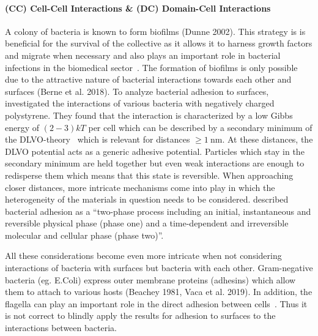 \documentclass{article}
\begin{document}
\paragraph{(CC) Cell-Cell Interactions \& (DC) Domain-Cell Interactions}
A colony of bacteria is known to form biofilms (Dunne 2002). This strategy is is beneficial for the
survival of the collective as it allows it to harness growth factors and migrate when necessary and
also plays an important role in bacterial infections in the biomedical sector~\cite{Ong1999}.
The formation of biofilms is only possible due to the attractive nature of bacterial interactions
towards each other and surfaces (Berne et al. 2018). To analyze bacterial adhesion to surfaces,
\cite{vanLoosdrecht1989} investigated the interactions of various bacteria with negatively charged
polystyrene.
They found that the interaction is characterized by a low Gibbs energy of $(2 - 3)kT$ per cell
which can be described by a secondary minimum of the DLVO-theory~\cite{Verwey1947,Derjaguin1993}
which is relevant for distances $\geq\SI{1}{\nano\meter}$.
At these distances, the DLVO potential acts as a generic adhesive potential.
Particles which stay in the secondary minimum are held together but even weak interactions are
enough to redisperse them which means that this state is reversible.
When approaching closer distances, more intricate mechanisms come into play in which the
heterogeneity of the materials in question needs to be considered.
\cite{Hori2010} described bacterial adhesion as a “two-phase process including an initial,
instantaneous and reversible physical phase (phase one) and a time-dependent and irreversible
molecular and cellular phase (phase two)”.

All these considerations become even more intricate when not considering interactions of bacteria
with surfaces but bacteria with each other.
Gram-negative bacteria (eg. E.Coli) express outer membrane proteins (adhesins) which allow them to
attach to various hosts (Beachey 1981, Vaca et al. 2019).
In addition, the flagella can play an important role in the direct adhesion between
cells~\cite{Haiko2013}.
Thus it is not correct to blindly apply the results for adhesion to surfaces to the interactions
between bacteria.
\end{document}
